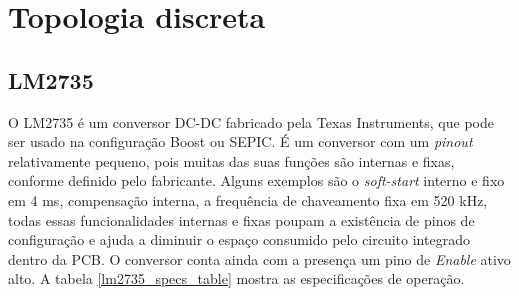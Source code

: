 \section{Topologia discreta}

\subsection*{LM2735}

\noindent
\begin{minipage}{\linewidth}
\label{fig:lm2735_stock}
\end{minipage}

O LM2735 \cite{lm2735_datasheet} é um conversor DC-DC fabricado pela Texas Instruments, que pode ser usado na configuração Boost ou SEPIC. É um conversor com um \textit{pinout} relativamente pequeno, pois muitas das suas funções são internas e fixas, conforme definido pelo fabricante. Alguns exemplos são o \textit{soft-start} interno e fixo em 4 ms, compensação interna, a frequência de chaveamento fixa em 520 kHz, todas essas funcionalidades internas e fixas poupam a existência de pinos de configuração e ajuda a diminuir o espaço consumido pelo circuito integrado dentro da PCB. O conversor conta ainda com a presença um pino de \textit{Enable} ativo alto. A tabela \ref{lm2735_specs_table} mostra as especificações de operação.



